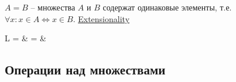 \documentclass[a4paper,10pt]{article}
\begin{document}
\begin{terms}
    \item $A = B$ -- множества $A$ и $B$ содержат одинаковые элементы, т.е. $\forall x : x \in A \iff x \in B$.
    \hfill\href{https://en.wikipedia.org/wiki/Axiom_of_extensionality}{Extensionality}
    \begin{terms}
        \item \begin{tabular}{\ML{4.5cm} \ML{4.5cm} L}
             = 
            &  = 
            &  \neq {}
        \end{tabular}
    \end{terms}
\end{terms}


\subsection{Операции над множествами}
\end{document}
